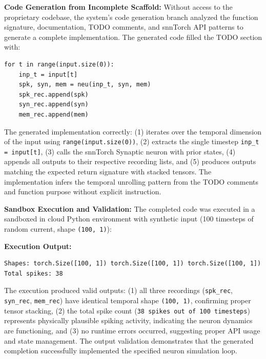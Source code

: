 \vspace{0.3cm}

\noindent \textbf{Code Generation from Incomplete Scaffold:} Without access to the proprietary codebase, the system's code generation branch analyzed the function signature, documentation, TODO comments, and snnTorch API patterns to generate a complete implementation. The generated code filled the TODO section with:

\begin{lstlisting}
for t in range(input.size(0)):
    inp_t = input[t]
    spk, syn, mem = neu(inp_t, syn, mem)
    spk_rec.append(spk)
    syn_rec.append(syn)
    mem_rec.append(mem)
\end{lstlisting}

The generated implementation correctly: (1) iterates over the temporal dimension of the input using \texttt{range(input.size(0))}, (2) extracts the single timestep \texttt{inp\_t = input[t]}, (3) calls the snnTorch Synaptic neuron with prior states, (4) appends all outputs to their respective recording lists, and (5) produces outputs matching the expected return signature with stacked tensors. The implementation infers the temporal unrolling pattern from the TODO comments and function purpose without explicit instruction.

\vspace{0.3cm}

\noindent \textbf{Sandbox Execution and Validation:} The completed code was executed in a sandboxed in cloud Python environment with synthetic input (100 timesteps of random current, shape \texttt{(100, 1)}):

\begin{center}
  \textbf{Execution Output:}
  \begin{verbatim}
Shapes: torch.Size([100, 1]) torch.Size([100, 1]) torch.Size([100, 1])
Total spikes: 38
\end{verbatim}
\end{center}

The execution produced valid outputs: (1) all three recordings (\texttt{spk\_rec}, \texttt{syn\_rec}, \texttt{mem\_rec}) have identical temporal shape \texttt{(100, 1)}, confirming proper tensor stacking, (2) the total spike count (\texttt{38 spikes out of 100 timesteps}) represents physically plausible spiking activity, indicating the neuron dynamics are functioning, and (3) no runtime errors occurred, suggesting proper API usage and state management. The output validation demonstrates that the generated completion successfully implemented the specified neuron simulation loop.

